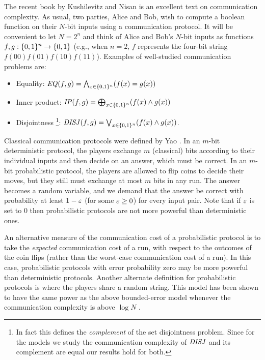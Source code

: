 The recent book by Kushilevitz and Nisan \cite{KN96} is an excellent text 
on communication complexity.
As usual, two parties, Alice and Bob, wish to compute a boolean function
on their $N$-bit inputs using a communication protocol.
It will be convenient to let $N = 2^n$ and think of Alice and Bob's 
$N$-bit inputs as functions $f, g : \01^n \rightarrow \01$ 
(e.g., when $n=2$, $f$ represents the four-bit string 
$f(00)f(01)f(10)f(11)$).
Examples of well-studied communication problems are: 
\begin{itemize} 
\item Equality: 
$\EQ(f,g) = \bigwedge_{x \in \01^n} (f(x) = g(x))$
\item Inner product: 
$\IP(f,g) = \bigoplus_{x \in \01^n} (f(x) \wedge g(x))$
\item Disjointness%
\footnote{In fact this defines the {\em complement} of the set disjointness 
problem. Since for the models we study the communication complexity of 
$\mbox{\it DISJ\/}$ and its complement are equal our results hold for both.}: 
$\DISJ(f,g) = \bigvee_{x \in \01^n} (f(x) \wedge g(x))$.
\end{itemize}

Classical communication  protocols were defined by Yao \cite{Ya79}. 
In an $m$-bit deterministic protocol, the players exchange $m$ 
(classical) bits according to their individual inputs and then decide on 
an answer, which must be correct.
In an $m$-bit probabilistic protocol, the players are allowed to flip 
coins to decide their moves, but they still must exchange at most $m$ 
bits in any run.
The answer becomes a random variable, and we demand that the answer be 
correct with probability at least $1 - \varepsilon$ (for some $\varepsilon \ge 0$) for every 
input pair.
Note that if $\varepsilon$ is set to 0 then probabilistic protocols are not more 
powerful than deterministic ones.

An alternative measure of the communication cost of a probabilistic 
protocol is to take the {\it expected\/} communication cost of a run,  
with respect to the outcomes of the coin flips (rather than the 
worst-case communication cost of a run).
In this case, probabilistic protocols with error probability zero may 
be more powerful than deterministic protocols.
Another alternate definition for probabilistic protocols is where the 
players share a random string.
This model has been shown to have the same power as the above 
bounded-error model whenever the communication complexity is above 
$\log N$ \cite{Ne91}.

